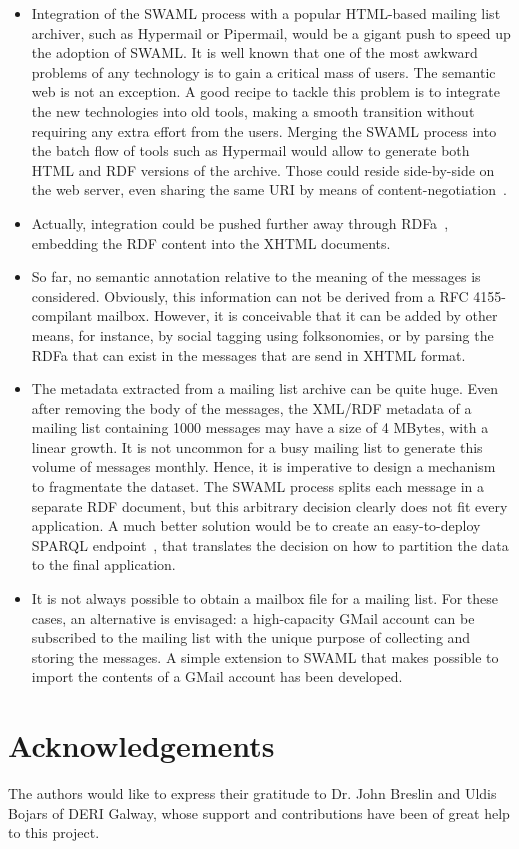 \documentclass{llncs}
\begin{document}
\begin{itemize}
  \item Integration of the SWAML process with a popular HTML-based
        mailing list archiver, such as Hypermail or Pipermail, would be
        a gigant push to speed up the adoption of SWAML. It is well
        known that one of the most awkward problems of any technology
        is to gain a critical mass of users. The semantic web is not
        an exception. A good recipe to tackle this problem is to
        integrate the new technologies into old tools, making
        a smooth transition without requiring any extra effort from
        the users. Merging the SWAML process into the batch flow of
        tools such as Hypermail would allow to generate both
        HTML and RDF versions of the archive. Those could reside
        side-by-side on the web server, even sharing the same URI
        by means of content-negotiation~\cite{Recipes}.
  \item Actually, integration could be pushed further away through
        RDFa~\cite{Birbeck2006}, embedding the RDF content into the
        XHTML documents.
  \item So far, no semantic annotation relative to the meaning of
        the messages is considered. Obviously, this information can not
        be derived from a RFC 4155-compilant mailbox\cite{RFC4155}.
        However, it is
        conceivable that it can be added by other means, for instance,
        by social tagging using folksonomies, or by parsing the RDFa
        that can exist in the messages that are send in XHTML format.
  \item The metadata extracted from a mailing list archive can be
        quite huge. Even after removing the body of the messages, the
        XML/RDF metadata of a mailing list containing 1000 messages may
        have a size of 4 MBytes, with a linear growth. It is not uncommon
        for a busy mailing list to generate this volume of messages
        monthly. Hence, it is imperative to design a mechanism to
        fragmentate the dataset. The SWAML process splits each message
        in a separate RDF document, but this arbitrary decision clearly
        does not fit every application. A much better solution would be to
        create an easy-to-deploy SPARQL endpoint~\cite{SPARQLProtocol},
        that translates the
        decision on how to partition the data to the final application.
  \item It is not always possible to obtain a mailbox file for a mailing
        list. For these cases, an alternative is envisaged: a high-capacity
        GMail account can be subscribed to the mailing list with the unique
        purpose of collecting and storing the messages. A simple extension
        to SWAML that makes possible to import the contents of a GMail
        account has been developed.

\end{itemize}

\section*{Acknowledgements}

The authors would like to express their gratitude to Dr. John Breslin and
Uldis Bojars of DERI Galway, whose support and contributions have been of 
great help to this project.



%
\end{document}
